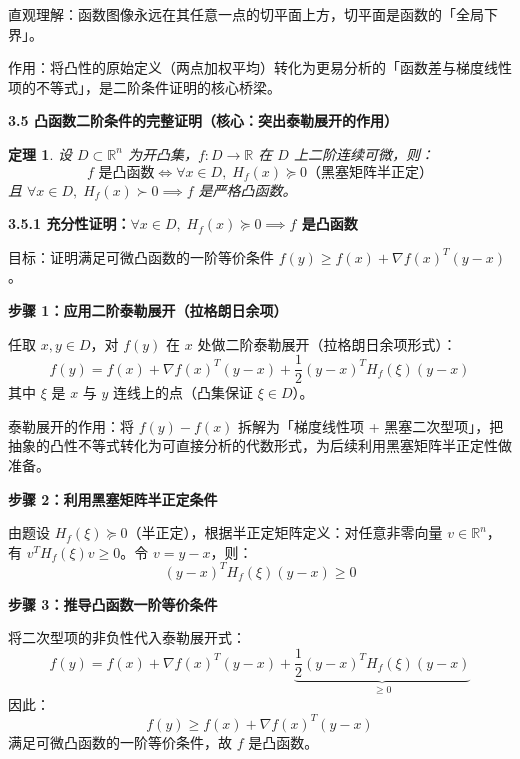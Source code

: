 \documentclass[10pt]{article}
\numberwithin{equation}{section}
\theoremstyle{plain}
\newtheorem{theorem}{定理}[section]
\theoremstyle{definition}
\theoremstyle{remark}
\newcommand{\R}{\mathbb{R}}
\begin{document}
直观理解：函数图像永远在其任意一点的切平面上方，切平面是函数的「全局下界」。

作用：将凸性的原始定义（两点加权平均）转化为更易分析的「函数差与梯度线性项的不等式」，是二阶条件证明的核心桥梁。

\textbf{3.5 凸函数二阶条件的完整证明（核心：突出泰勒展开的作用）}

\begin{theorem}
	设 $D\subset\R^n$ 为开凸集，$f:D\to\R$ 在 $D$ 上二阶连续可微，则：
	\[f \text{ 是凸函数}\iff\forall x\in D,\; H_f(x)\succeq 0\text{（黑塞矩阵半正定）}\]
	且 $\forall x\in D,\; H_f(x)\succ 0\implies f$ 是严格凸函数。
\end{theorem}

\textbf{3.5.1 充分性证明：$\forall x\in D,\;H_f(x)\succeq 0\implies f$ 是凸函数}

目标：证明满足可微凸函数的一阶等价条件 $f(y)\geq f(x)+\nabla f(x)^T(y-x)$。

{\par\vspace{0.8ex}\noindent\normalsize\bfseries\color{secblue} 步骤 1：应用二阶泰勒展开（拉格朗日余项）\par}

任取 $x,y\in D$，对 $f(y)$ 在 $x$ 处做二阶泰勒展开（拉格朗日余项形式）：
\[f(y)=f(x)+\nabla f(x)^T(y-x)+\frac{1}{2}(y-x)^TH_f(\xi)(y-x)\]
其中 $\xi$ 是 $x$ 与 $y$ 连线上的点（凸集保证 $\xi\in D$）。

泰勒展开的作用：将 $f(y)-f(x)$ 拆解为「梯度线性项 + 黑塞二次型项」，把抽象的凸性不等式转化为可直接分析的代数形式，为后续利用黑塞矩阵半正定性做准备。

{\par\vspace{0.8ex}\noindent\normalsize\bfseries\color{secblue} 步骤 2：利用黑塞矩阵半正定条件\par}

由题设 $H_f(\xi)\succeq 0$（半正定），根据半正定矩阵定义：对任意非零向量 $v\in\R^n$，有 $v^TH_f(\xi)v\geq 0$。令 $v=y-x$，则：
\[(y-x)^TH_f(\xi)(y-x)\geq 0\]

{\par\vspace{0.8ex}\noindent\normalsize\bfseries\color{secblue} 步骤 3：推导凸函数一阶等价条件\par}

将二次型项的非负性代入泰勒展开式：
\[f(y)=f(x)+\nabla f(x)^T(y-x)+\underbrace{\frac{1}{2}(y-x)^TH_f(\xi)(y-x)}_{\geq 0}\]
因此：
\[f(y)\geq f(x)+\nabla f(x)^T(y-x)\]
满足可微凸函数的一阶等价条件，故 $f$ 是凸函数。
\end{document}
